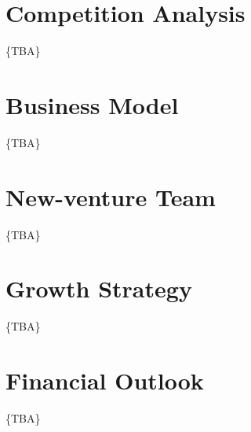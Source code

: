 \documentclass[twoside,final]{hcmut-report}
\begin{document}
\clearpage
\section{Competition Analysis}
\{TBA\}

\clearpage
\section{Business Model}
\{TBA\}

\clearpage
\section{New-venture Team}
\{TBA\}

\clearpage
\section{Growth Strategy}
\{TBA\}

\clearpage
\section{Financial Outlook}
\{TBA\}



\nocite{*}
\end{document}
